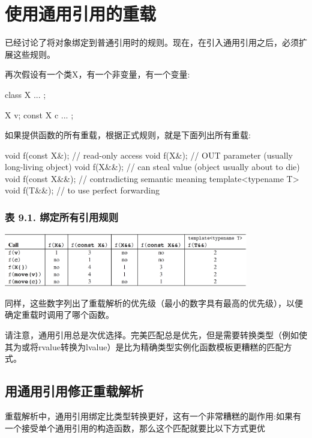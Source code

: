 \section{使用通用引用的重载}
已经讨论了将对象绑定到普通引用时的规则。现在，在引入通用引用之后，必须扩展这些规则。

再次假设有一个类X，有一个非变量，有一个变量:

\begin{cppcode}
class X {
	...
};

X v;
const X c{ ... };
\end{cppcode}

如果提供函数的所有重载，根据正式规则，就是下面列出所有重载:

\begin{cppcode}
void f(const X&); // read-only access
void f(X&); // OUT parameter (usually long-living object)
void f(X&&); // can steal value (object usually about to die)
void f(const X&&); // contradicting semantic meaning
template<typename T>
void f(T&&); // to use perfect forwarding
\end{cppcode}

\subsubsection{表 9.1. 绑定所有引用规则}
\begin{center}
	\includegraphics[width=0.8\textwidth]{part2/ch9/images/1}
\end{center}

同样，这些数字列出了重载解析的优先级（最小的数字具有最高的优先级），以便确定重载时调用了哪个函数。

请注意，通用引用总是次优选择。完美匹配总是优先，但是需要转换类型（例如使其为或将rvalue转换为lvalue）是比为精确类型实例化函数模板更糟糕的匹配方式。

\subsection{用通用引用修正重载解析}

重载解析中，通用引用绑定比类型转换更好，这有一个非常糟糕的副作用:如果有一个接受单个通用引用的构造函数，那么这个匹配就要比以下方式更优

